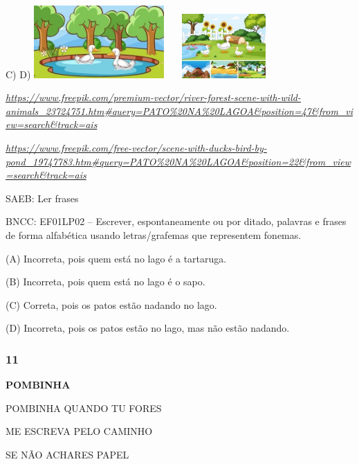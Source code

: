 C) D)
\includegraphics[width=1.96319in,height=1.09028in]{media/image252.jpg}\includegraphics[width=1.78681in,height=0.96806in]{media/image253.jpg}

\href{https://www.freepik.com/premium-vector/river-forest-scene-with-wild-animals_23724751.htm\#query=PATO\%20NA\%20LAGOA\&position=47\&from_view=search\&track=ais}{\emph{https://www.freepik.com/premium-vector/river-forest-scene-with-wild-animals\_23724751.htm\#query=PATO\%20NA\%20LAGOA\&position=47\&from\_view=search\&track=ais}}

\href{https://www.freepik.com/free-vector/scene-with-ducks-bird-by-pond_19747783.htm\#query=PATO\%20NA\%20LAGOA\&position=22\&from_view=search\&track=ais}{\emph{https://www.freepik.com/free-vector/scene-with-ducks-bird-by-pond\_19747783.htm\#query=PATO\%20NA\%20LAGOA\&position=22\&from\_view=search\&track=ais}}

SAEB: Ler frases

BNCC: EF01LP02 -- Escrever, espontaneamente ou por ditado, palavras e frases de
forma alfabética usando letras/grafemas que representem fonemas.

(A) Incorreta, pois quem está no lago é a tartaruga.

(B) Incorreta, pois quem está no lago é o sapo.

(C) Correta, pois os patos estão nadando no lago.

(D) Incorreta, pois os patos estão no lago, mas não estão nadando.

\subsubsection{11 }\label{section-83}

\textbf{POMBINHA}

POMBINHA QUANDO TU FORES

ME ESCREVA PELO CAMINHO

SE NÃO ACHARES PAPEL

